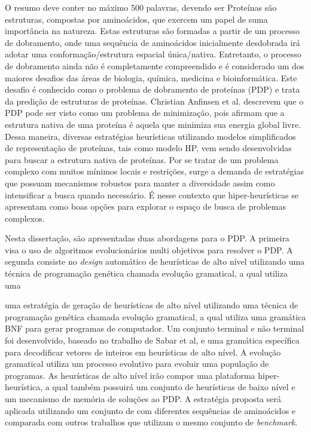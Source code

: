 \begin{resumo}

O resumo deve conter no máximo 500 palavras, devendo ser 
Proteínas são estruturas, compostas por aminoácidos, que exercem um papel de suma importância na natureza. Estas estruturas são formadas a partir de um processo de dobramento, onde uma sequência de aminoácidos inicialmente desdobrada irá adotar uma conformação/estrutura espacial única/nativa. Entretanto, o processo de dobramento ainda não é completamente compreendido e é considerado um dos maiores desafios das áreas de biologia, química, medicina e bioinformática. Este desafio é conhecido como o problema de dobramento de proteínas (PDP) e trata da predição de estruturas de proteínas. Christian Anfinsen et al. descrevem que o PDP pode ser visto como um problema de minimização, pois afirmam que a estrutura nativa de uma proteína é aquela que minimiza sua energia global livre. Dessa maneira, diversas estratégias heurísticas utilizando modelos simplificados de representação de proteínas, tais como modelo HP, vem sendo desenvolvidas para buscar a estrutura nativa de proteínas. Por se tratar de um problema complexo com muitos mínimos locais e restrições, surge a demanda de estratégias que possuam mecanismos robustos para manter a diversidade assim como intensificar a busca quando necessário. É nesse contexto que hiper-heurísticas se apresentam como boas opções para explorar o espaço de busca de problemas complexos. 



Nesta dissertação, são apresentadas duas abordagens para o PDP. A primeira visa o uso de algoritmos evolucionários multi objetivos para resolver o PDP. A segunda consiste no \textit{design} automático de heurísticas de alto nível utilizando uma técnica de programação genética chamada evolução gramatical, a qual utiliza uma 

uma estratégia de geração de heurísticas de alto nível utilizando uma técnica de programação genética chamada evolução gramatical, a qual utiliza uma gramática BNF para gerar programas de computador. Um conjunto terminal e não terminal foi desenvolvido, baseado no trabalho de Sabar et al, e uma gramática específica para decodificar vetores de inteiros em heurísticas de alto nível. A evolução gramatical utiliza um processo evolutivo para evoluir uma população de programas. As heurísticas de alto nível irão compor uma plataforma hiper-heurística, a qual também possuirá um conjunto de heurísticas de baixo nível e um mecanismo de memória de soluções ao PDP. A estratégia proposta será aplicada utilizando um conjunto de  com diferentes sequências de aminoácidos e comparada com outros trabalhos que utilizam o mesmo conjunto de \textit{benchmark}.




\end{resumo}

